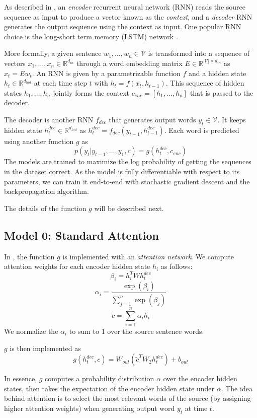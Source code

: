 \documentclass[11pt]{report}
\begin{document}
As described in \cite{bahdanau2014neural}, an \emph{encoder} recurrent neural network (RNN) reads the source sequence as input to produce a vector known as the \emph{context}, and a \emph{decoder} RNN generates the output sequence using the context as input.  One popular RNN choice is the long-short term memory (LSTM) network \citep{hochreiter1997long}.

More formally, a given sentence $w_1, \ldots, w_n \in \mathcal{V}$ is transformed into a sequence of vectors $x_1, \ldots, x_n \in \mathbb{R}^{d_{in}}$ through a word embedding matrix $E \in \mathbb{R}^{|\mathcal{V}| \times d_{in}}$ as $x_t = Ew_t$. An RNN is given by a parametrizable function $f$ and a hidden state $h_t \in \mathbb{R}^{ d_{hid}}$ at each time step $t$ with $h_t = f(x_t, h_{t-1})$. This sequence of hidden states $h_1, \ldots, h_n$ jointly forms the context $c_{enc} = [h_1, \ldots, h_n]$ that is passed to the decoder.


The decoder is another RNN $f_{dec}$ that generates output words $y_t \in \mathcal{V}$. It keeps hidden state $h_t^{dec} \in \mathbb{R}^{d_{hid}}$ as $h_t^{dec} = f_{dec}(y_{t-1}, h_{t-1}^{dec})$. Each word is predicted using another function $g$ as
$$p(y_t | y_{t-1}, \ldots, y_1, c) = g(h_t^{dec}, c_{enc})$$
The models are trained to maximize the log probability of getting the sequences in the dataset correct. As the model is fully differentiable with respect to its parameters, we can train it end-to-end with stochastic gradient descent and the backpropagation algorithm.

The details of the function $g$ will be described next.

\subsection{Model 0: Standard Attention}

In \cite{bahdanau2014neural}, the function $g$ is implemented with an \emph{attention network}. We compute attention weights for each encoder hidden state $h_i$ as follows:
$$\beta_i = h_i^T W h_t^{dec}$$
$$\alpha_i = \frac{\exp(\beta_i)}{\sum_{j=1}^n \exp(\beta_j)}$$
$$\widetilde{c} = \sum_{i=1}^n \alpha_i h_i$$
We normalize the $\alpha_i$ to sum to 1 over the source sentence words.

$g$ is then implemented as
$$g(h_t^{dec}, c) = W_{out}(\widetilde{c}^T W_2 h_t^{dec}) + b_{out}$$

In essence, $g$ computes a probability distribution $\alpha$ over the encoder hidden states, then takes the expectation of the encoder hidden state under $\alpha$. The idea behind attention is to select the most relevant words of the source (by assigning higher attention weights) when generating output word $y_t$ at time $t$.
\end{document}
